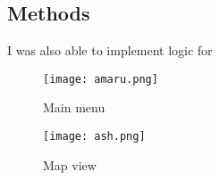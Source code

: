 \documentclass[11pt, oneside, a4paper]{article}
\begin{document}
\subsection{Methods}

I was also able to implement logic for  

\begin{figure}[H]
    \centering
    \begin{minipage}{0.5\textwidth}
        \centering
        \texttt{[image: amaru.png]}
        \caption{Main menu}
    \end{minipage}%
    \begin{minipage}{0.5\textwidth}
        \centering
        \texttt{[image: ash.png]}
        \caption{Map view}
    \end{minipage}
\end{figure}
    
\end{document}
